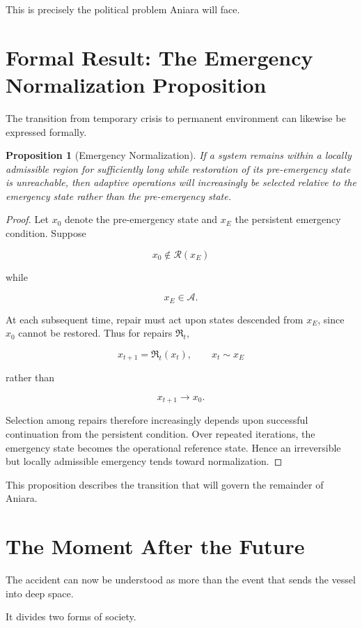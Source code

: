 \documentclass[11pt,oneside]{book}
\newtheorem{proposition}[theorem]{Proposition}
\theoremstyle{definition}
\theoremstyle{remark}
\newcommand{\A}{\mathcal{A}}
\newcommand{\R}{\mathcal{R}}
\newcommand{\Repair}{\mathfrak{R}}
\begin{document}
This is precisely the political problem Aniara will face.

\section{Formal Result: The Emergency Normalization Proposition}

The transition from temporary crisis to permanent environment can likewise be expressed formally.

\begin{proposition}[Emergency Normalization]
If a system remains within a locally admissible region for sufficiently long while restoration of its pre-emergency state is unreachable, then adaptive operations will increasingly be selected relative to the emergency state rather than the pre-emergency state.
\end{proposition}

\begin{proof}
Let \(x_0\) denote the pre-emergency state and \(x_E\) the persistent emergency condition. Suppose

\[
x_0\notin\R(x_E)
\]

while

\[
x_E\in\A.
\]

At each subsequent time, repair must act upon states descended from \(x_E\), since \(x_0\) cannot be restored. Thus for repairs \(\Repair_t\),

\[
x_{t+1}
=
\Repair_t(x_t),
\qquad
x_t\sim x_E
\]

rather than

\[
x_{t+1}\rightarrow x_0.
\]

Selection among repairs therefore increasingly depends upon successful continuation from the persistent condition. Over repeated iterations, the emergency state becomes the operational reference state. Hence an irreversible but locally admissible emergency tends toward normalization.
\end{proof}

This proposition describes the transition that will govern the remainder of Aniara.

\section{The Moment After the Future}

The accident can now be understood as more than the event that sends the vessel into deep space.

It divides two forms of society.
\end{document}
